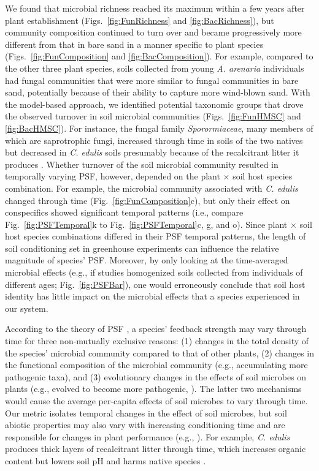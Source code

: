 We found that microbial richness reached its maximum within a few years after plant establishment (Figs.~\ref{fig:FunRichness} and \ref{fig:BacRichness}), but community composition continued to turn over and became progressively more different from that in bare sand in a manner specific to plant species (Figs.~\ref{fig:FunComposition} and \ref{fig:BacComposition}). 
For example, compared to the other three plant species, soils collected from young \textit{A. arenaria} individuals had fungal communities that were more similar to fungal communities in bare sand, potentially because of their ability to capture more wind-blown sand.
With the model-based approach, we identified potential taxonomic groups that drove the observed turnover in soil microbial communities (Figs.~\ref{fig:FunHMSC} and \ref{fig:BacHMSC}). For instance, the fungal family \textit{Sporormiaceae}, many members of which are saprotrophic fungi, increased through time in soils of the two natives but decreased in \textit{C. edulis} soils presumably because of the recalcitrant litter it produces \citep{Novoa2014}.
Whether turnover of the soil microbial community resulted in temporally varying PSF, however, depended on the plant $\times$ soil host species combination. For example, the microbial community associated with \textit{C. edulis} changed through time (Fig.~\ref{fig:FunComposition}c), but only their effect on conspecifics showed significant temporal patterns (i.e., compare Fig.~\ref{fig:PSFTemporal}k to Fig.~\ref{fig:PSFTemporal}c, g, and o).
Since plant $\times$ soil host species combinations differed in their PSF temporal patterns, the length of soil conditioning set in greenhouse experiments can influence the relative magnitude of species' PSF.
Moreover, by only looking at the time-averaged microbial effects (e.g., if studies homogenized soils collected from individuals of different ages; Fig.~\ref{fig:PSFBar}), one would erroneously conclude that soil host identity has little impact on the microbial effects that a species experienced in our system.
\par


According to the theory of PSF \citep{Bever1997}, a species' feedback strength may vary through time for three non-mutually exclusive reasons: (1) changes in the total density of the species' microbial community compared to that of other plants, (2) changes in the functional composition of the microbial community (e.g., accumulating more pathogenic taxa), and (3) evolutionary changes in the effects of soil microbes on plants (e.g., evolved to become more pathogenic, \citealp{Dostal2013, Packer2004}). The latter two mechanisms would cause the average per-capita effects of soil microbes to vary through time.
Our metric isolates temporal changes in the effect of soil microbes, but soil abiotic properties may also vary with increasing conditioning time and are responsible for changes in plant performance (e.g., \citealp{Lepinay2018}). For example, \textit{C. edulis} produces thick layers of recalcitrant litter through time, which increases organic content but lowers soil pH and harms native species \citep{Conser2009, Novoa2014}. 
\par



